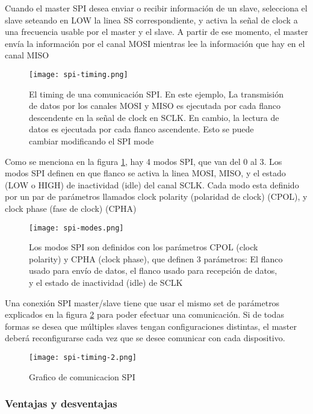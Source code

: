 \documentclass[../informe_krapp.tex]{subfiles}
\begin{document}
Cuando el master SPI desea enviar o recibir información de un slave, selecciona el
slave seteando en LOW la linea SS correspondiente, y activa la señal de clock a una
frecuencia usable por el master y el slave.
A partir de ese momento, el master envía la información por el canal MOSI mientras lee
la información que hay en el canal MISO

\begin{figure}[H]
	\centering
	\texttt{[image: spi-timing.png]}
	\caption{El timing de una comunicación SPI. En este ejemplo,
		La transmisión de datos por los canales MOSI y MISO es ejecutada por
		cada flanco descendente en la señal de clock en SCLK. En cambio,
		la lectura de datos es ejecutada por cada flanco ascendente.
		Esto se puede cambiar modificando el SPI mode }
	\label{spi-timing}
\end{figure}

Como se menciona en la figura \ref{spi-timing}, hay 4 modos SPI, que van del 0 al 3.
Los modos SPI definen en que flanco se activa la linea MOSI, MISO, y el estado (LOW o HIGH)
de inactividad (idle) del canal SCLK.
Cada modo esta definido por un par de parámetros llamados clock polarity
(polaridad de clock) (CPOL), y clock phase (fase de clock) (CPHA)

\begin{figure}[H]
	\centering
	\texttt{[image: spi-modes.png]}
	\caption{Los modos SPI son definidos con los parámetros CPOL (clock polarity) y CPHA
		(clock phase), que definen 3 parámetros: El flanco usado para envío de datos, el
		flanco usado para recepción de datos, y el estado de inactividad (idle) de SCLK}
	\label{spi-modes}
\end{figure}

Una conexión SPI master/slave tiene que usar el mismo set de parámetros explicados
en la figura \ref{spi-modes} para poder efectuar una comunicación.
Si de todas formas se desea que múltiples slaves tengan configuraciones distintas,
el master deberá reconfigurarse cada vez que se desee comunicar con cada dispositivo.
\begin{figure}[H]
	\centering
	\texttt{[image: spi-timing-2.png]}
	\caption{Grafico de comunicacion SPI}
\end{figure}

\subsubsection{Ventajas y desventajas}
\end{document}
